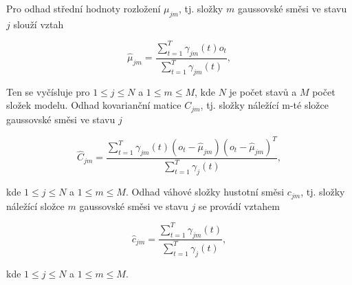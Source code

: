 \noindent Pro odhad střední hodnoty rozložení $\mu_{jm}$, tj. složky $m$ gaussovské směsi ve stavu $j$ slouží vztah

\begin{equation}
  \hat{\mu}_{jm} = \frac{\sum_{t=1}^{T}\gamma_{jm}\left(t\right)o_t}{\sum_{t=1}^{T}\gamma_{jm}\left(t\right)},
  \label{eq:asr:acoustic:structure:mu}
\end{equation}

\noindent Ten se vyčísluje pro $1 \leq j \leq N$ a $1 \leq m \leq M$, kde $N$ je počet stavů a $M$ počet složek modelu. Odhad kovarianční matice $C_{jm}$, tj. složky náležící m-té složce gaussovské směsi ve stavu $j$

\begin{equation}
  \hat{C}_{jm} = \frac{\sum_{t=1}^{T} \gamma_{jm}\left(t\right)\left(o_t - \hat{\mu}_{jm}\right)\left(o_t - \hat{\mu}_{jm}\right)^{T}}{\sum_{t=1}^{T}\gamma_j\left(t\right)},
  \label{eq:asr:acoustic:structure:covariant}
\end{equation}

\noindent kde $1 \leq j \leq N$ a $1 \leq m \leq M$. Odhad váhové složky hustotní směsi $c_{jm}$, tj. složky náležící složce $m$ gaussovské směsi ve stavu $j$ se provádí vztahem

\begin{equation}
  \hat{c}_{jm} = \frac{\sum_{t=1}^{T} \gamma_{jm}\left(t\right)}{\sum_{t=1}^{T}\gamma_j\left(t\right)},
  \label{eq:asr:acoustic:structure:weight}
\end{equation}

\noindent kde $1 \leq j \leq N$ a $1 \leq m \leq M$.



